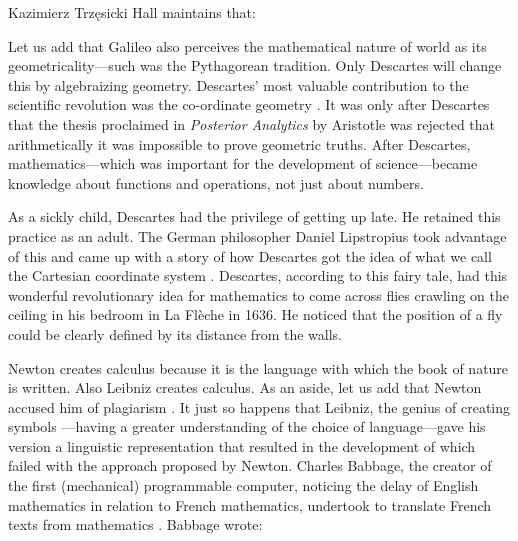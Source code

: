 \begin{artengenv}{Kazimierz Trzęsicki}
Hall \parencite*[p.97]{Hall1956}  maintains that: 

Let us add that Galileo also perceives the mathematical nature of world as its geometricality---such was the Pythagorean tradition. Only Descartes will change this by algebraizing geometry.  Descartes' most valuable contribution to the scientific revolution was the co-ordinate geometry \parencite[
p.200]{Hall1956}.  It was only after Descartes that the thesis proclaimed in \emph{Posterior Analytics} by Aristotle was rejected that arithmetically it was impossible to prove geometric truths. After Descartes, mathematics---which was important for the development of science---became knowledge about functions and operations, not just about numbers.

As a sickly child, Descartes had the privilege of getting up late. He retained this practice as an adult. The German philosopher Daniel Lipstropius took advantage of this and came up with a story of how Descartes got the idea of what we call the Cartesian coordinate system \parencite[pp.111--112] {Mazur2014}. Descartes, according to this fairy tale, had this wonderful revolutionary idea for mathematics to come across flies crawling on the ceiling in his bedroom in La Flèche in 1636. He noticed that the position of a fly could be clearly defined by its distance from the walls.

Newton creates calculus because it is the language with which the book of nature is written. Also Leibniz creates calculus. As an aside, let us add that Newton accused him of plagiarism \parencite{Sonar2018}. It just so happens that Leibniz, the genius of creating symbols \parencite['The Symbol Master', cf.][pp.165--168]{Mazur2014}---having a greater understanding of the choice of language---gave his version a linguistic representation that resulted in the development of which failed with the approach proposed by Newton. Charles Babbage, the creator of the first (mechanical) programmable computer, noticing the delay of English mathematics in relation to French mathematics, undertook to translate French texts from mathematics \parencite{Trzesicki2006c}. Babbage  \parencite*{Babbage1864,Babbage2008} wrote: 


\end{artengenv}

